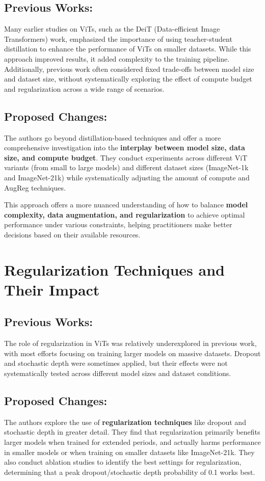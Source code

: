 \documentclass{report}
\begin{document}
	 \subsection{Previous Works:}
	 Many earlier studies on ViTs, such as the DeiT (Data-efficient Image Transformers) work, emphasized the importance of using teacher-student distillation to enhance the performance of ViTs on smaller datasets. While this approach improved results, it added complexity to the training pipeline. Additionally, previous work often considered fixed trade-offs between model size and dataset size, without systematically exploring the effect of compute budget and regularization across a wide range of scenarios.
	 
	 
	 \subsection{Proposed Changes:}
	 The authors go beyond distillation-based techniques and offer a more comprehensive investigation into the \textbf{interplay between model size, data size, and compute budget}. They conduct experiments across different ViT variants (from small to large models) and different dataset sizes (ImageNet-1k and ImageNet-21k) while systematically adjusting the amount of compute and AugReg techniques.
	 
	 
	 This approach offers a more nuanced understanding of how to balance \textbf{model complexity, data augmentation, and regularization} to achieve optimal performance under various constraints, helping practitioners make better decisions based on their available resources.
	 
	 
	 
	 
	 
	 
	 \section{Regularization Techniques and Their Impact}
	 \subsection{Previous Works:}
	 The role of regularization in ViTs was relatively underexplored in previous work, with most efforts focusing on training larger models on massive datasets. Dropout and stochastic depth were sometimes applied, but their effects were not systematically tested across different model sizes and dataset conditions.
	 
	 
	 \subsection{Proposed Changes:}
	 The authors explore the use of \textbf{regularization techniques} like dropout and stochastic depth in greater detail. They find that regularization primarily benefits larger models when trained for extended periods, and actually harms performance in smaller models or when training on smaller datasets like ImageNet-21k. They also conduct ablation studies to identify the best settings for regularization, determining that a peak dropout/stochastic depth probability of 0.1 works best.
	 
\end{document}
